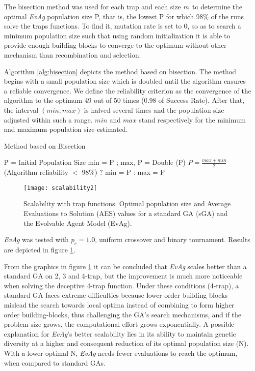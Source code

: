 The bisection method  \cite{sastry:bisection} was used for each trap and each size \textit{m}\ to determine
the optimal \emph{EvAg} population size P, that is, the lowest P for which
98\% of the runs solve the traps functions. To find it, mutation rate
is set to 0, so as to search a minimum population size such
that using random initialization it is able to provide enough building
blocks to converge to the optimum without other mechanism than
recombination and selection. 


Algorithm \ref{alg:bisection} depicts the method based on bisection.
The method begins with a small population size which is doubled until
the algorithm ensures a reliable convergence. We define the
reliability criterion as the convergence of the algorithm to the
optimum 49 out of 50 times (0.98 of Success Rate). After that, the
interval $(min,max)$ is halved several times and the population size
adjusted within such a range. $min$ and $max$ stand respectively for the minimum and maximum population size estimated.

\begin{algorithm}
\caption{Method based on Bisection}
\label{alg:bisection}
\begin{algorithmic}
\STATE P = Initial Population Size
\STATE min = P ; max, P = Double (P)
\ENDWHILE
{}
\STATE $P = \frac{max+min}{2}$ 
\STATE (Algorithm reliability $<$ 98\%) ? min = P : max = P
\ENDWHILE
\end{algorithmic}
\end{algorithm}






\begin{figure}[!htpb]
\centerline{\texttt{[image: scalability2]}}

\caption{Scalability with trap functions. Optimal population size and Average Evaluations to Solution (AES) values for a standard GA (sGA) and the Evolvable Agent Model (EvAg). }
\label{fig:scalability}
\end{figure}

\emph{EvAg} was tested with $p_c = 1.0$, uniform crossover and binary tournament. Results are depicted in figure \ref{fig:scalability}.

From the graphics in figure \ref{fig:scalability} it can be concluded that \emph{EvAg} scales better than a standard GA on 2, 3 and 4-trap, but the improvement is much more noticeable when solving the deceptive 4-trap function. Under these conditions (4-trap), a standard GA faces extreme difficulties because lower order building blocks mislead the search towards local optima instead of combining to form higher order building-blocks, thus challenging the GA's search mechanisms, and if the problem size grows, the computational effort grows exponentially. A possible explanation for \emph{EvAg}'s better scalability lies in its ability to maintain genetic diversity at a higher and consequent reduction of its optimal population size (N). With a lower optimal N, \emph{EvAg} needs fewer evaluations to reach the optimum, when compared to standard GAs. 
